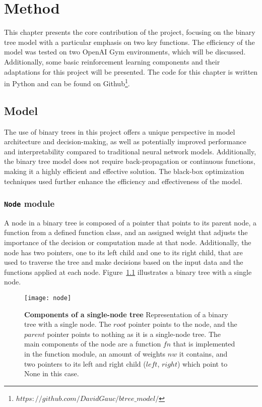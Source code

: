
\chapter{Method}
\label{ch:method}

This chapter presents the core contribution of the project, focusing on the binary tree model with a particular emphasis on two key functions. The efficiency of the model was tested on two OpenAI Gym environments, which will be discussed. Additionally, some basic reinforcement learning components and their adaptations for this project will be presented. The code for this chapter is written in Python and can be found on Github\footnote{$https://github.com/DavidGauc/btree\_model/$}.

\section{Model}
The use of binary trees in this project offers a unique perspective in model architecture and decision-making, as well as potentially improved performance and interpretability compared to traditional neural network models. Additionally, the binary tree model does not require back-propagation or continuous functions, making it a highly efficient and effective solution. The black-box optimization techniques used further enhance the efficiency and effectiveness of the model.

\subsection{\texttt{Node} module}
A node in a binary tree is composed of a pointer that points to its parent node, a function from a defined function class, and an assigned weight that adjusts the importance of the decision or computation made at that node. Additionally, the node has two pointers, one to its left child and one to its right child, that are used to traverse the tree and make decisions based on the input data and the functions applied at each node. Figure~\ref{fig:node_composition} illustrates a binary tree with a single node.
\begin{figure}[!ht]
\centering
\texttt{[image: node]}

\caption[Components of a single-node tree]{
  \textbf{Components of a single-node tree}
Representation of a binary tree with a single node. The $root$ pointer points to the node, and the $parent$ pointer points to nothing as it is a single-node tree. The main components of the node are a function $fn$ that is implemented in the function module, an amount of weights $nw$ it contains, and two pointers to its left and right child ($left$, $right$) which point to None in this case.
 }
\label{fig:node_composition}
\end{figure}

